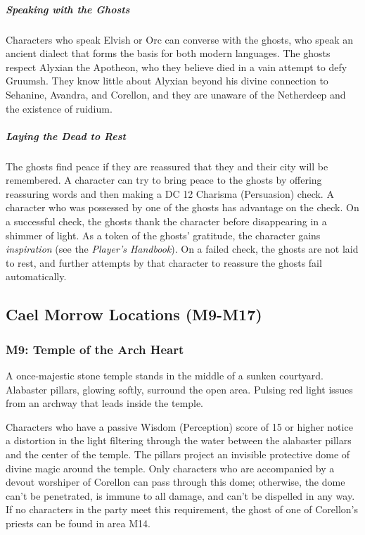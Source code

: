 \documentclass[10pt,a4paper,twoside,fancy,bg=print,twocolumn,openany,nodeprecatedcode]{dndbook}
\begin{document}
\subparagraph{Speaking with the Ghosts}
Characters who speak Elvish or Orc can converse with the ghosts, who speak an ancient dialect that forms the basis for both modern languages. The ghosts respect Alyxian the Apotheon, who they believe died in a vain attempt to defy Gruumsh. They know little about Alyxian beyond his divine connection to Sehanine, Avandra, and Corellon, and they are unaware of the Netherdeep and the existence of ruidium.

\subparagraph{Laying the Dead to Rest}
The ghosts find peace if they are reassured that they and their city will be remembered. A character can try to bring peace to the ghosts by offering reassuring words and then making a DC 12 Charisma (Persuasion) check. A character who was possessed by one of the ghosts has advantage on the check. On a successful check, the ghosts thank the character before disappearing in a shimmer of light. As a token of the ghosts' gratitude, the character gains \textit{inspiration} (see the \textit{Player's Handbook}). On a failed check, the ghosts are not laid to rest, and further attempts by that character to reassure the ghosts fail automatically.

\subsection{Cael Morrow Locations (M9-M17)}
\subsubsection{M9: Temple of the Arch Heart}
\begin{DndReadAloud}{}
A once-majestic stone temple stands in the middle of a sunken courtyard. Alabaster pillars, glowing softly, surround the open area. Pulsing red light issues from an archway that leads inside the temple.

\end{DndReadAloud}

Characters who have a passive Wisdom (Perception) score of 15 or higher notice a distortion in the light filtering through the water between the alabaster pillars and the center of the temple. The pillars project an invisible protective dome of divine magic around the temple. Only characters who are accompanied by a devout worshiper of Corellon can pass through this dome; otherwise, the dome can't be penetrated, is immune to all damage, and can't be dispelled in any way. If no characters in the party meet this requirement, the ghost of one of Corellon's priests can be found in area M14.
\end{document}
